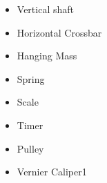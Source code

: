 \begin{itemize}
    \item {Vertical shaft}
    \item {Horizontal Crossbar}
    \item {Hanging Mass}
    \item {Spring}
    \item {Scale}
    \item {Timer}
    \item {Pulley}
    \item {Vernier Caliper1}
    \label{mat}
\end{itemize}


